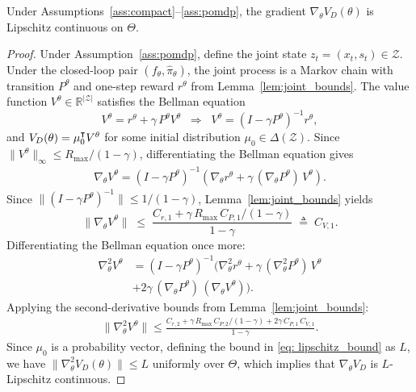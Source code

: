 \documentclass[12pt]{article}
\newcommand\raiseT[2]{\raisebox{0.25ex}{$#1#2$}
}
\renewcommand{\[}{\left[}
\renewcommand{\]}{\right]}
\renewcommand{\(}{\left(}
\renewcommand{\)}{\right)}
\newcounter{l1}
\newcounter{l2}
\newcounter{l3}
\renewcommand{\top}{{\mathpalette\raiseT\intercal}}
\newcommand{\Rmax}{R_{\max}}
\begin{document}
\begin{theorem}\label{thm:lipschitz}
Under Assumptions~\ref{ass:compact}--\ref{ass:pomdp}, the gradient
$\nabla_\theta V_D(\theta)$ is Lipschitz continuous on $\Theta$.
\end{theorem}

\begin{proof}
Under Assumption~\ref{ass:pomdp}, define the joint state $z_t = (x_t, s_t) \in \mathcal{Z}$.
Under the closed-loop pair $(f_\theta, \widehat\pi_\theta)$, the joint process is a
Markov chain with transition $P^\theta$ and one-step reward $r^\theta$ from
Lemma~\ref{lem:joint_bounds}. The value function $V^\theta \in \mathbb{R}^{|\mathcal{Z}|}$
satisfies the Bellman equation
\begin{equation*}
  V^\theta = r^\theta + \gamma\, P^\theta V^\theta
  \;\;\Longrightarrow\;\;
  V^\theta = (I - \gamma P^\theta)^{-1} r^\theta,
\end{equation*}
and $V_D(\theta) = \mu_0^\top V^\theta$ for some initial distribution $\mu_0 \in
\Delta(\mathcal{Z})$. Since $\|V^\theta\|_\infty \le \Rmax/(1-\gamma)$, differentiating
the Bellman equation gives
\begin{align*}
  \nabla_\theta V^\theta
  = (I - \gamma P^\theta)^{-1}
    \!\left(\nabla_\theta r^\theta + \gamma\,(\nabla_\theta P^\theta)\, V^\theta\right).
\end{align*}
Since $\|(I-\gamma P^\theta)^{-1}\| \le 1/(1-\gamma)$, Lemma~\ref{lem:joint_bounds}
yields
\begin{equation*}
  \|\nabla_\theta V^\theta\|
  \;\le\;
  \frac{C_{r,1} + \gamma\,\Rmax\,C_{P,1}/(1-\gamma)}{1-\gamma}
  \;\triangleq\; C_{V,1}.
\end{equation*}
Differentiating the Bellman equation once more:
\begin{align*}
  \nabla^2_\theta V^\theta
  &= (I-\gamma P^\theta)^{-1}\!
    \Big(
      \nabla^2_\theta r^\theta
      + \gamma\,(\nabla^2_\theta P^\theta)\, V^\theta
      \\
      &+ 2\gamma\,(\nabla_\theta P^\theta)\,(\nabla_\theta V^\theta)
    \Big).
\end{align*}
Applying the second-derivative bounds from Lemma~\ref{lem:joint_bounds}:
\begin{align}\label{eq: lipschitz_bound}
  \|\nabla^2_\theta V^\theta\|
  \leq
  \frac{C_{r,2} + \gamma\,\Rmax\,C_{P,2}/(1-\gamma) + 2\gamma\,C_{P,1}\,C_{V,1}}{1-\gamma}.
\end{align}
Since $\mu_0$ is a probability vector, defining the bound in \ref{eq: lipschitz_bound} as $L$, we have
$\|\nabla^2_\theta V_D(\theta)\| \le L$ uniformly over $\Theta$, which implies that
$\nabla_\theta V_D$ is $L$-Lipschitz continuous.
\end{proof}
\end{document}
